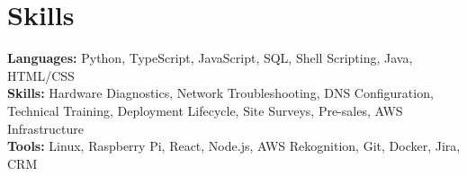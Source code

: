 \documentclass[11pt]{article}       %
\begin{document}
\vspace{-18.5pt}

\section*{Skills}
\textbf{Languages:} Python, TypeScript, JavaScript, SQL, Shell Scripting, Java, HTML/CSS\\
\textbf{Skills:} Hardware Diagnostics, Network Troubleshooting, DNS Configuration, Technical Training, Deployment Lifecycle, Site Surveys, Pre-sales, AWS Infrastructure\\
\textbf{Tools:} Linux, Raspberry Pi, React, Node.js, AWS Rekognition, Git, Docker, Jira, CRM\\

\vspace{-6.5pt}
\end{document}
